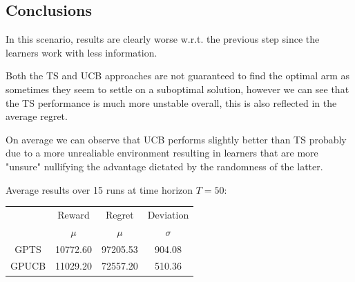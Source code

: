
\subsection{Conclusions}

In this scenario, results are clearly worse w.r.t. the previous step since the learners work with less information.

Both the TS and UCB approaches are not guaranteed to find the optimal arm as sometimes they seem to settle on a suboptimal solution, however we can see that the TS performance is much more unstable overall, this is also reflected in the average regret.

On average we can observe that UCB performs slightly better than TS probably due to a more unrealiable environment resulting in learners that are more "unsure" nullifying the advantage dictated by the randomness of the latter.

Average results over 15 runs at time horizon $T = 50$:

\begin{table}[h]
	\center
	\begin{tabular}{|c|cc|c|}
	\hline \hline
		\cellcolor{blue!25} & Reward 	& Regret	& Deviation \\
	\cline{2-4}
		\cellcolor{blue!25} & $\mu$		& $\mu$		& $\sigma$	\\
	\hline \hline
		GPTS 				& 10772.60	& 97205.53	& 904.08	\\
	\hline
		GPUCB				& 11029.20	& 72557.20	& 510.36	\\
	\hline \hline
	\end{tabular}
\end{table}
